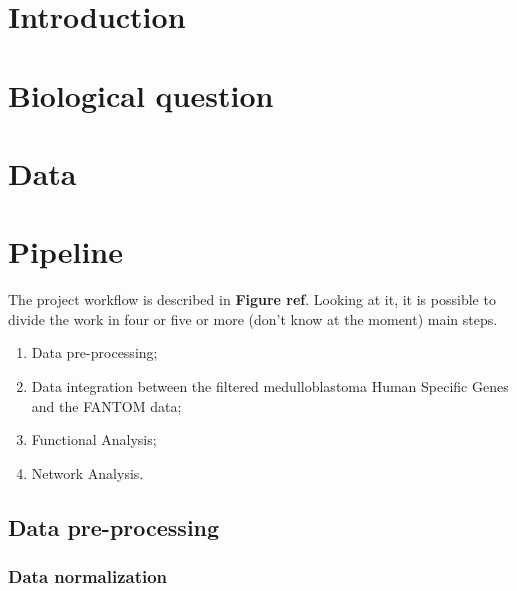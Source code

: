 \documentclass[10pt]{SelfArx} %
\affiliation{\textsuperscript{1}\textit{}} %
\affiliation{\textsuperscript{2}\textit{}} %
\affiliation{\textsuperscript{3}\textit{}} %
\affiliation{\textsuperscript{4}\textit{}} %
\affiliation{\textsuperscript{5}\textit{}} %
\begin{document}
\maketitle %



\section*{Introduction}\label{sec:introduction}

\section{Biological question}\label{sec:biological_question}

\section{Data}\label{sec:data}


\section{Pipeline}\label{sec:pipeline}
The project workflow is described in \textbf{Figure ref}. Looking at it, it is possible to divide the work in four or five or more (don't know at the moment) main steps.

\begin{enumerate}
    \item Data pre-processing;
    \item Data integration between the filtered medulloblastoma Human Specific Genes and the FANTOM data;
    \item Functional Analysis;
    \item Network Analysis.
\end{enumerate}

\subsection{Data pre-processing}\label{sec:pre_processing}
\subsubsection{Data normalization}\label{sec:normalization}
\end{document}

